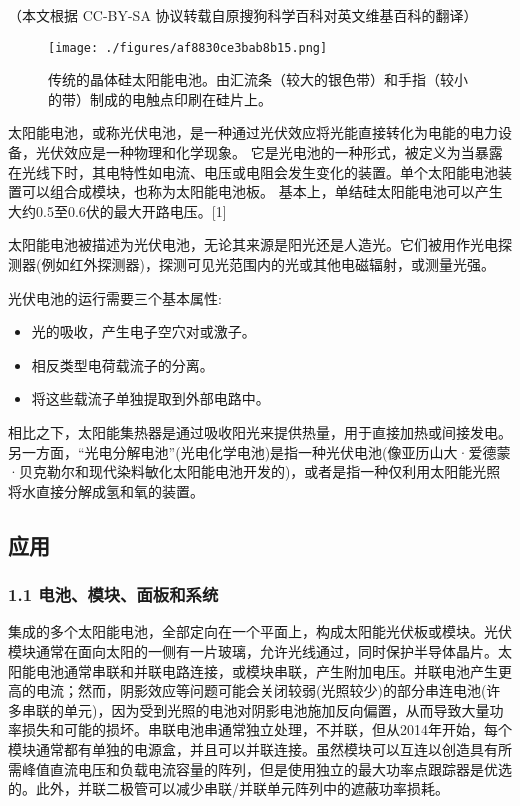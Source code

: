 
（本文根据 CC-BY-SA 协议转载自原搜狗科学百科对英文维基百科的翻译）

\begin{figure}[ht]
\centering
\texttt{[image: ./figures/af8830ce3bab8b15.png]}
\caption{传统的晶体硅太阳能电池。由汇流条（较大的银色带）和手指（较小的带）制成的电触点印刷在硅片上。} \label{fig_TYNDC_1}
\end{figure}

太阳能电池，或称光伏电池，是一种通过光伏效应将光能直接转化为电能的电力设备，光伏效应是一种物理和化学现象。 它是光电池的一种形式，被定义为当暴露在光线下时，其电特性如电流、电压或电阻会发生变化的装置。单个太阳能电池装置可以组合成模块，也称为太阳能电池板。 基本上，单结硅太阳能电池可以产生大约0.5至0.6伏的最大开路电压。[1]

太阳能电池被描述为光伏电池，无论其来源是阳光还是人造光。它们被用作光电探测器(例如红外探测器)，探测可见光范围内的光或其他电磁辐射，或测量光强。

光伏电池的运行需要三个基本属性:
\begin{itemize}
\item 光的吸收，产生电子空穴对或激子。
\item 相反类型电荷载流子的分离。
\item 将这些载流子单独提取到外部电路中。
\end{itemize}

相比之下，太阳能集热器是通过吸收阳光来提供热量，用于直接加热或间接发电。另一方面，“光电分解电池”(光电化学电池)是指一种光伏电池(像亚历山大·爱德蒙·贝克勒尔和现代染料敏化太阳能电池开发的)，或者是指一种仅利用太阳能光照将水直接分解成氢和氧的装置。

\subsection{应用}



\subsubsection{1.1 电池、模块、面板和系统}

集成的多个太阳能电池，全部定向在一个平面上，构成太阳能光伏板或模块。光伏模块通常在面向太阳的一侧有一片玻璃，允许光线通过，同时保护半导体晶片。太阳能电池通常串联和并联电路连接，或模块串联，产生附加电压。并联电池产生更高的电流；然而，阴影效应等问题可能会关闭较弱(光照较少)的部分串连电池(许多串联的单元)，因为受到光照的电池对阴影电池施加反向偏置，从而导致大量功率损失和可能的损坏。串联电池串通常独立处理，不并联，但从2014年开始，每个模块通常都有单独的电源盒，并且可以并联连接。虽然模块可以互连以创造具有所需峰值直流电压和负载电流容量的阵列，但是使用独立的最大功率点跟踪器是优选的。此外，并联二极管可以减少串联/并联单元阵列中的遮蔽功率损耗。




